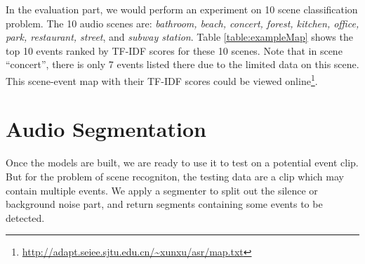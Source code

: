 In the evaluation part, we would perform an experiment on 10 scene classification problem. 
The 10 audio scenes are: \textit{bathroom, beach, concert, forest, kitchen, office, park, restaurant, street}, and \textit{subway station}. 
Table \ref{table:exampleMap} shows the top 10 events ranked by TF-IDF scores for these 10 scenes. 
Note that in scene ``concert'', there is only 7 events listed there due to the limited data on this scene. 
This scene-event map with their TF-IDF scores could be viewed online\footnote{\url{http://adapt.seiee.sjtu.edu.cn/~xunxu/asr/map.txt}}. 

\begin{table}[htb!]
\centering
{}
\caption{An example of scene-event map}
\label{table:exampleMap}
\end{table}



\section{Audio Segmentation}
Once the models are built, we are ready to use it to test on a potential event clip. 
But for the problem of scene recogniton, the testing data are a clip which may contain multiple events. 
We apply a segmenter to split out the silence or background noise part, and return segments containing some events to be detected. 

